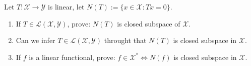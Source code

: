 \documentclass{ctexart}
\begin{document}
\begin{problem}
  Let \(T:\mathcal{X} \to \mathcal{Y}\) is linear, let \(N(T):=\{x \in \mathcal{X}: Tx = 0\}\).
  \begin{enumerate}
    \item \label{it:1}If \(T \in \mathscr{L}(\mathcal{X},\mathcal{Y})\), prove: \(N(T)\)
      is closed subspace of \(\mathcal{X}\).
    \item Can we infer \(T \in \mathscr{L}(\mathcal{X},\mathcal{Y})\) throught that \(N(T)\) is closed subspace in \(\mathcal{X}\). 
    \item If \(f \) is a linear functional, prove: \(f \in \mathcal{X}^* \iff N(f)\) is closed subspace in \(\mathcal{X}\).
      
  \end{enumerate}
\end{problem}
\end{document}
